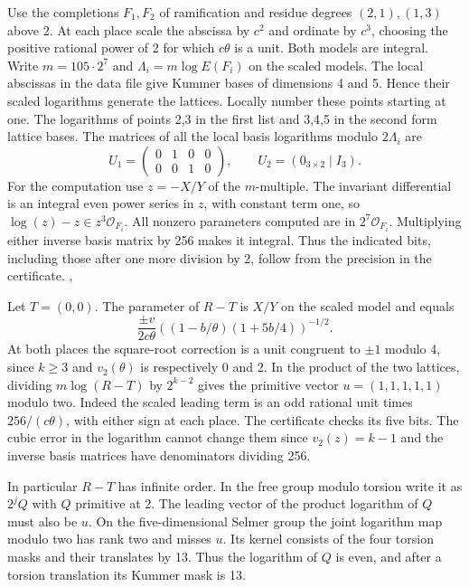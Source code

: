 Use the completions \(F_1,F_2\) of ramification and residue degrees
\((2,1),(1,3)\) above 2. At each place scale the abscissa by \(c^2\)
and ordinate by \(c^3\), choosing the positive rational power of 2 for
which \(c\theta\) is a unit. Both models are integral. Write
\(m=105\cdot2^7\) and \(\Lambda_i=m\log E(F_i)\) on the scaled models.
The local abscissas in the data file give Kummer bases of dimensions
4 and 5. Hence their scaled logarithms generate the lattices.
Locally number these points starting at one. The logarithms of points
2,3 in the first list and 3,4,5 in the second form lattice bases.
The matrices of all the local basis logarithms modulo \(2\Lambda_i\) are
\[U_1=\begin{pmatrix}0&1&0&0\\0&0&1&0\end{pmatrix},
 \qquad U_2=(0_{3\times2}\mid I_3).\]
For the computation use \(z=-X/Y\) of the \(m\)-multiple. The invariant
differential is an integral even power series in \(z\), with constant
term one, so \(\log(z)-z\in z^3\mathcal O_{F_i}\). All nonzero
parameters computed are in \(2^7\mathcal O_{F_i}\). Multiplying either
inverse basis matrix by 256 makes it integral. Thus the indicated
bits, including those after one more division by 2, follow from the
precision in the certificate.
,

Let \(T=(0,0)\). The parameter of \(R-T\) is \(X/Y\) on the scaled
model and equals
\[\frac{\pm v}{2c\theta}
 \left((1-b/\theta)(1+5b/4)\right)^{-1/2}.\]
At both places the square-root correction is a unit congruent to
\(\pm1\) modulo 4, since \(k\ge3\) and \(v_2(\theta)\) is respectively
0 and 2. In the product of the two lattices, dividing
\(m\log(R-T)\) by \(2^{k-2}\) gives the primitive vector
\(u=(1,1,1,1,1)\) modulo two. Indeed the scaled leading term is an
odd rational unit times \(256/(c\theta)\), with either sign at each
place. The certificate checks its five bits. The cubic error in the
logarithm cannot change them since \(v_2(z)=k-1\) and the inverse
basis matrices have denominators dividing 256.

In particular \(R-T\) has infinite order. In the free group modulo
torsion write it as \(2^j Q\) with \(Q\) primitive at 2. The leading
vector of the product logarithm of \(Q\) must also be \(u\). On the
five-dimensional Selmer group the joint logarithm map modulo two has
rank two and misses \(u\). Its kernel consists of the four torsion
masks and their translates by 13. Thus the logarithm of \(Q\) is
even, and after a torsion translation its Kummer mask is 13.

